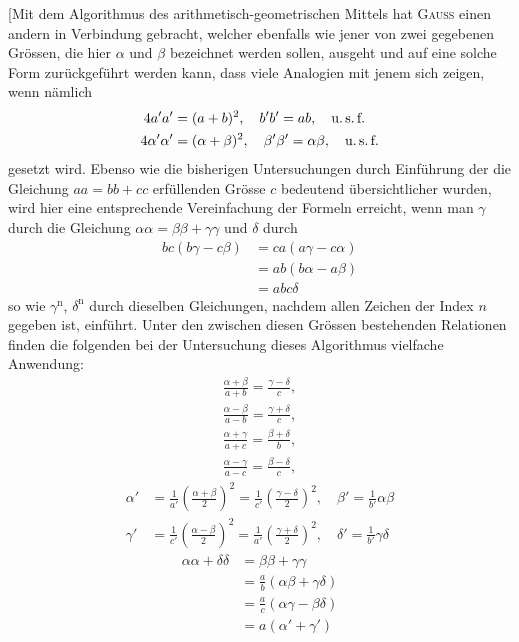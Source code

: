 [Mit dem Algorithmus des arithmetisch-geometrischen Mittels hat \textsc{Gauss}
einen andern in Verbindung gebracht, welcher ebenfalls wie jener von zwei gegebenen
Grössen, die hier $\alpha$ und $\beta$ bezeichnet werden sollen, ausgeht und auf
eine solche Form zurückgeführt werden kann, dass viele Analogien mit jenem
sich zeigen, wenn nämlich
\[
\begin{aligned}
4a'a'&=(a+b)^2,\quad b'b'=ab,\quad\text{u.\,s.\,f.}\\
4\alpha'\alpha'&=(\alpha+\beta)^2,\quad\beta'\beta'=\alpha\beta,\quad\text{u.\,s.\,f.}
\end{aligned}
\]
gesetzt wird. Ebenso wie die bisherigen Untersuchungen durch Einführung der
die Gleichung $aa=bb+cc$ erfüllenden Grösse $c$ bedeutend übersichtlicher
wurden, wird hier eine entsprechende Vereinfachung der Formeln erreicht, wenn
man $\gamma$ durch die Gleichung $\alpha\alpha=\beta\beta+\gamma\gamma$ und $\delta$ durch
\[
\begin{aligned}bc(b\gamma-c\beta)&=ca(a\gamma-c\alpha)\\&=ab(b\alpha-a\beta)\\&=abc\delta\end{aligned}
\]
so wie $\gamma^{\mathrm n}$, $\delta^{\mathrm n}$ durch dieselben Gleichungen, nachdem allen Zeichen der Index $n$
gegeben ist, einführt. Unter den zwischen diesen Grössen bestehenden Relationen
finden die folgenden bei der Untersuchung dieses Algorithmus vielfache Anwendung:
\[
\begin{gathered}\frac{\alpha+\beta}{a+b}=\frac{\gamma-\delta}{c},\\[5pt]
\frac{\alpha-\beta}{a-b}=\frac{\gamma+\delta}{c},\\[5pt]
\frac{\alpha+\gamma}{a+c}=\frac{\beta+\delta}{b},\\[5pt]
\frac{\alpha-\gamma}{a-c}=\frac{\beta-\delta}{c},\end{gathered}
\]
\[
\begin{aligned}
\alpha'&=\frac1{a'}\left(\frac{\alpha+\beta}{2}\right)^2
=\frac1{c'}\left(\frac{\gamma-\delta}{2}\right)^2,\quad
\beta'=\frac1{b'}\alpha\beta\\
\gamma'&=\frac1{c'}\left(\frac{\alpha-\beta}{2}\right)^2
=\frac1{a'}\left(\frac{\gamma+\delta}{2}\right)^2,\quad
\delta'=\frac1{b'}\gamma\delta
\end{aligned}
\]
\[
\begin{aligned}\alpha\alpha+\delta\delta&=\beta\beta+\gamma\gamma
\\&=\frac ab(\alpha\beta+\gamma\delta)\\&=\frac ac(\alpha\gamma-\beta\delta)
\\&=a(\alpha'+\gamma')\end{aligned}
\]
